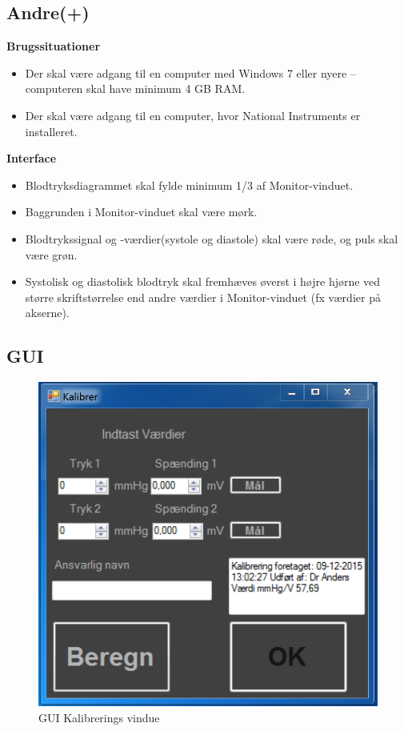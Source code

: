 \subsection{Andre(+)}
\textbf{Brugssituationer}
\begin{itemize}
	\item Der skal være adgang til en computer med Windows 7 eller nyere – computeren skal have minimum 4 GB RAM.
	\item Der skal være adgang til en computer, hvor National Instruments er installeret.
\end{itemize}
\textbf{Interface}
\begin{itemize}
	\item Blodtryksdiagrammet skal fylde minimum 1/3 af Monitor-vinduet.
	\item Baggrunden i Monitor-vinduet skal være mørk.
	\item Blodtrykssignal og -værdier(systole og diastole) skal være røde, og puls skal være grøn.
	\item Systolisk og diastolisk blodtryk skal fremhæves øverst i højre hjørne ved større skriftstørrelse end andre værdier i Monitor-vinduet (fx værdier på akserne).
\end{itemize}

\subsection{GUI}
\begin{figure}[H]
	\centering
	\includegraphics[width=1\textwidth]{Figurer/Kalibrer2}
	\caption{GUI  Kalibrerings vindue}
	\label{fig:GUI  Kalibrerings vindue}
\end{figure}

